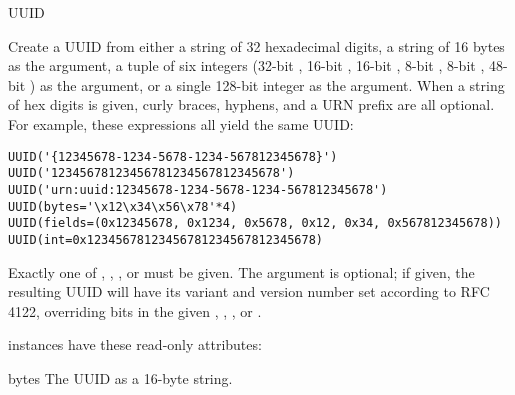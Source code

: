 \begin{classdesc}{UUID}{}


Create a UUID from either a string of 32 hexadecimal digits,
a string of 16 bytes as the  argument, a tuple of six
integers (32-bit , 16-bit , 
16-bit ,
8-bit , 8-bit , 48-bit )
as the  argument, or a single 128-bit integer as the 
argument.  When a string of hex digits is given, curly braces,
hyphens, and a URN prefix are all optional.  For example, these
expressions all yield the same UUID:

\begin{verbatim}
UUID('{12345678-1234-5678-1234-567812345678}')
UUID('12345678123456781234567812345678')
UUID('urn:uuid:12345678-1234-5678-1234-567812345678')
UUID(bytes='\x12\x34\x56\x78'*4)
UUID(fields=(0x12345678, 0x1234, 0x5678, 0x12, 0x34, 0x567812345678))
UUID(int=0x12345678123456781234567812345678)
\end{verbatim}

Exactly one of , , , or  must
be given.  The  argument is optional; if given, the
resulting UUID will have its variant and version number set according to
RFC 4122, overriding bits in the given , ,
, or .

\end{classdesc}

 instances have these read-only attributes:

\begin{memberdesc}{bytes}
The UUID as a 16-byte string.
\end{memberdesc}

